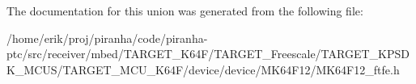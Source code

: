 The documentation for this union was generated from the following file\+:\begin{DoxyCompactItemize}
\item 
/home/erik/proj/piranha/code/piranha-\/ptc/src/receiver/mbed/\+T\+A\+R\+G\+E\+T\+\_\+\+K64\+F/\+T\+A\+R\+G\+E\+T\+\_\+\+Freescale/\+T\+A\+R\+G\+E\+T\+\_\+\+K\+P\+S\+D\+K\+\_\+\+M\+C\+U\+S/\+T\+A\+R\+G\+E\+T\+\_\+\+M\+C\+U\+\_\+\+K64\+F/device/device/\+M\+K64\+F12/M\+K64\+F12\+\_\+ftfe.\+h\end{DoxyCompactItemize}
